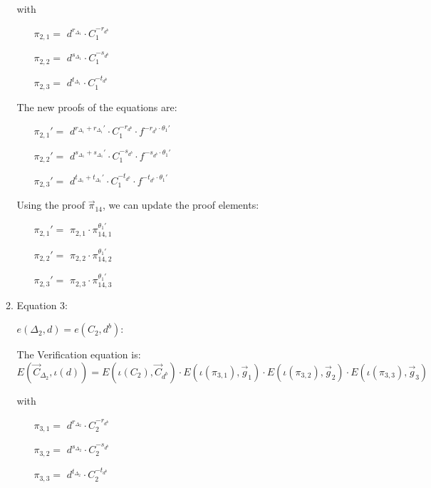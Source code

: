 \begin{description}
\begin{enumerate}
\begin{enumerate}
      with
      \begin{itemize}
      \item[$\pi_{2,1} = $] $d^{r_{\Delta_1}} \cdot C_1^{-r_{d^b}}$
      \item[$\pi_{2,2} = $] $d^{s_{\Delta_1}} \cdot C_1^{-s_{d^b}}$
      \item[$\pi_{2,3} = $] $d^{t_{\Delta_1}} \cdot C_1^{-t_{d^b}}$
      \end{itemize}

      The new proofs of the equations are:
      
      \begin{itemize}
      \item[$\pi_{2,1}' = $] $d^{r_{\Delta_1} + r_{\Delta_1}'} \cdot C_1^{-r_{d^b}} \cdot f^{-r_{d^b} \cdot \theta_1'}$    
      \item[$\pi_{2,2}' = $] $d^{s_{\Delta_1} + s_{\Delta_1}'} \cdot C_1^{-s_{d^b}} \cdot f^{-s_{d^b} \cdot \theta_1'}$    
      \item[$\pi_{2,3}' = $] $d^{t_{\Delta_1} + t_{\Delta_1}'} \cdot C_1^{-t_{d^b}} \cdot f^{-t_{d^b} \cdot \theta_1'}$
      \end{itemize}
      
      Using the proof $\vec{\pi}_{14}$, we can update the proof elements:
      \begin{itemize}
      \item[$\pi_{2,1}' = $] $\pi_{2,1} \cdot \pi_{14,1}^{\theta_1'}$    
      \item[$\pi_{2,2}' = $] $\pi_{2,2} \cdot \pi_{14,2}^{\theta_1'}$    
      \item[$\pi_{2,3}' = $] $\pi_{2,3} \cdot \pi_{14,3}^{\theta_1'}$
      \end{itemize}



    \item Equation 3:
      
      $e(\boxed{\Delta_2},d) = e(C_2, \boxed{d^b})$:
      
      The Verification equation is:  $E(\vec{C}_{\Delta_2}, \iota(d)) = E(\iota(C_2), \vec{C}_{d^b}) \cdot E(\iota(\pi_{3,1}), \vec{g}_1)\cdot E(\iota(\pi_{3,2}), \vec{g}_2)\cdot E(\iota(\pi_{3,3}), \vec{g}_3)$
      
      with
      \begin{itemize}
      \item[$\pi_{3,1} = $] $d^{r_{\Delta_2}} \cdot C_2^{-r_{d^b}}$
      \item[$\pi_{3,2} = $] $d^{s_{\Delta_2}} \cdot C_2^{-s_{d^b}}$
      \item[$\pi_{3,3} = $] $d^{t_{\Delta_2}} \cdot C_2^{-t_{d^b}}$
      \end{itemize}
      

\end{enumerate}
\end{enumerate}
\end{description}
